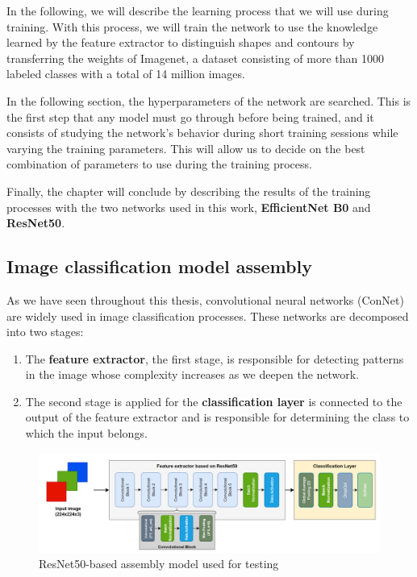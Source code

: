 In the following, we will describe the learning process that we will use during training. With this process, we will train the network to use the knowledge learned by the feature extractor to distinguish shapes and contours by transferring the weights of Imagenet, a dataset consisting of more than 1000 labeled classes with a total of 14 million images.

In the following section, the hyperparameters of the network are searched. This is the first step that any model must go through before being trained, and it consists of studying the network's behavior during short training sessions while varying the training parameters. This will allow us to decide on the best combination of parameters to use during the training process. 

Finally, the chapter will conclude by describing the results of the training processes with the two networks used in this work, \textbf{EfficientNet B0} and \textbf{ResNet50}.

\subsection{Image classification model assembly}

As we have seen throughout this thesis, convolutional neural networks (ConNet) are widely used in image classification processes. These networks are decomposed into two stages: 

\begin{enumerate}
    \item The \textbf{feature extractor}, the first stage, is responsible for detecting patterns in the image whose complexity increases as we deepen the network. 
    \item The second stage is applied for the  \textbf{classification layer} is connected to the output of the feature extractor and is responsible for determining the class to which the input belongs.
\end{enumerate}


\begin{figure}[ht]
    \begin{center}
        \includegraphics[scale=0.35]{images/Building/Transfer learning/Ensambled Model.png}
        \caption{ResNet50-based assembly model used for testing}
    \label{fig: Ensamble_Model_RNet50}    
    \end{center}
\end{figure}

